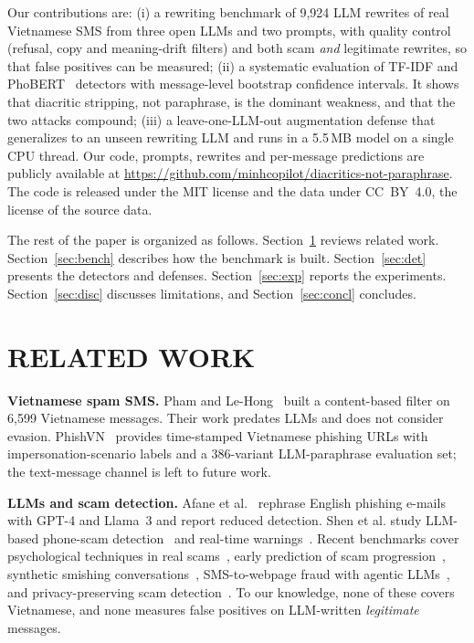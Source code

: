 \documentclass[11pt,a4paper]{article}
\begin{document}
Our contributions are:
(i) a rewriting benchmark of 9,924 LLM rewrites of real Vietnamese SMS from three open LLMs and two prompts, with quality control (refusal, copy and meaning-drift filters) and both scam \emph{and} legitimate rewrites, so that false positives can be measured;
(ii) a systematic evaluation of TF-IDF and PhoBERT~\cite{nguyen2020phobert} detectors with message-level bootstrap confidence intervals. It shows that diacritic stripping, not paraphrase, is the dominant weakness, and that the two attacks compound;
(iii) a leave-one-LLM-out augmentation defense that generalizes to an unseen rewriting LLM and runs in a 5.5\,MB model on a single CPU thread.
Our code, prompts, rewrites and per-message predictions are publicly available at \url{https://github.com/minhcopilot/diacritics-not-paraphrase}. The code is released under the MIT license and the data under CC~BY~4.0, the license of the source data.

The rest of the paper is organized as follows. Section~\ref{sec:related} reviews related work. Section~\ref{sec:bench} describes how the benchmark is built. Section~\ref{sec:det} presents the detectors and defenses. Section~\ref{sec:exp} reports the experiments. Section~\ref{sec:disc} discusses limitations, and Section~\ref{sec:concl} concludes.

\section{RELATED WORK}\label{sec:related}
\textbf{Vietnamese spam SMS.} Pham and Le-Hong~\cite{pham2017vnsms} built a content-based filter on 6,599 Vietnamese messages. Their work predates LLMs and does not consider evasion. PhishVN~\cite{vu2026phishvn} provides time-stamped Vietnamese phishing URLs with impersonation-scenario labels and a 386-variant LLM-paraphrase evaluation set; the text-message channel is left to future work.

\textbf{LLMs and scam detection.} Afane et al.~\cite{afane2024nextgen} rephrase English phishing e-mails with GPT-4 and Llama~3 and report reduced detection. Shen et al. study LLM-based phone-scam detection~\cite{shen2024phonescam} and real-time warnings~\cite{shen2025warned}. Recent benchmarks cover psychological techniques in real scams~\cite{ma2025psyscam}, early prediction of scam progression~\cite{sun2026prescam}, synthetic smishing conversations~\cite{lochstampfor2026smishing}, SMS-to-webpage fraud with agentic LLMs~\cite{zhou2026fraudsmswalker}, and privacy-preserving scam detection~\cite{hossain2025aiintheloop}. To our knowledge, none of these covers Vietnamese, and none measures false positives on LLM-written \emph{legitimate} messages.
\end{document}
